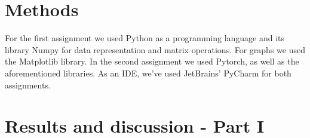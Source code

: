 \documentclass[a4paper]{article}
\begin{document}

\section{Methods}


For the first assignment we used Python as a programming language and its library Numpy for data representation and matrix operations. For graphs we used the Matplotlib library. In the second assignment we used Pytorch, as well as the aforementioned libraries. As an IDE, we've used JetBrains' PyCharm for both assignments.

\section{Results and discussion - Part I}
\end{document}
